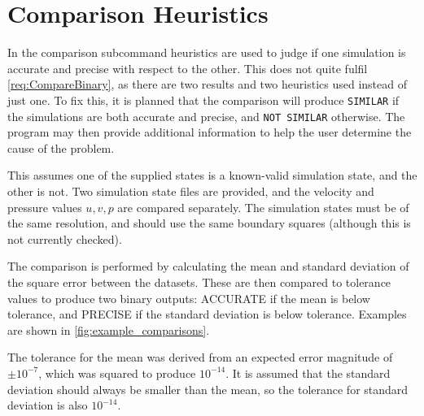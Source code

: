 

\section{Comparison Heuristics}
In the comparison subcommand heuristics are used to judge if one simulation is accurate and precise with respect to the other.
This does not quite fulfil \cref{req:CompareBinary}, as there are two results and two heuristics used instead of just one.
To fix this, it is planned that the comparison will produce \texttt{SIMILAR} if the simulations are both accurate and precise, and \texttt{NOT~SIMILAR} otherwise.
The program may then provide additional information to help the user determine the cause of the problem.

This assumes one of the supplied states is a known-valid simulation state, and the other is not.
Two simulation state files are provided, and the velocity and pressure values $u, v, p$ are compared separately.
The simulation states must be of the same resolution, and should use the same boundary squares (although this is not currently checked).

The comparison is performed by calculating the mean and standard deviation of the square error between the datasets.
These are then compared to tolerance values to produce two binary outputs: ACCURATE if the mean is below tolerance, and PRECISE if the standard deviation is below tolerance.
Examples are shown in \cref{fig:example_comparisons}.

The tolerance for the mean was derived from an expected error magnitude of $\pm 10^{-7}$, which was squared to produce $10^{-14}$.
It is assumed that the standard deviation should always be smaller than the mean, so the tolerance for standard deviation is also $10^{-14}$.

